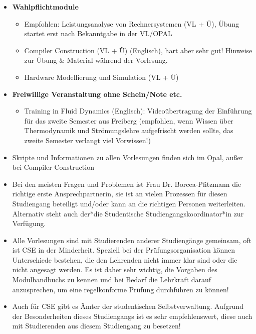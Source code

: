 \documentclass[a4paper,12pt]{report}
\begin{document}
\begin{itemize}
    \item \textbf{Wahlpflichtmodule}
    \begin{itemize}
        \item Empfohlen: Leistungsanalyse von Rechnersystemen (VL + Ü), Übung startet erst nach Bekanntgabe in der VL/OPAL
        \item Compiler Construction (VL + Ü) (Englisch), hart aber sehr gut! Hinweise zur Übung \& Material während der Vorlesung.
        \item Hardware Modellierung und Simulation (VL + Ü)
    \end{itemize}
    \item \textbf{Freiwillige Veranstaltung ohne Schein/Note etc.}
    \begin{itemize}
        \item Training in Fluid Dynamics (Englisch): Videoübertragung der Einführung für das zweite Semester aus Freiberg (empfohlen, wenn Wissen über Thermodynamik und Strömungslehre aufgefrischt werden sollte, das zweite Semester verlangt viel Vorwissen!)
    \end{itemize}
    \item Skripte und Informationen zu allen Vorlesungen finden sich im Opal, außer bei Compiler Construction
    \item Bei den meisten Fragen und Problemen ist Frau Dr. Borcea-Pfitzmann die richtige erste Ansprechpartnerin, sie ist an vielen Prozessen für diesen Studiengang beteiligt und/oder kann an die richtigen Personen weiterleiten. Alternativ steht auch der*die Studentische Studiengangskoordinator*in zur Verfügung.
    \item Alle Vorlesungen sind mit Studierenden anderer Studiengänge gemeinsam, oft ist CSE in der Minderheit. Speziell bei der Prüfungsorganisation können Unterschiede bestehen, die den Lehrenden nicht immer klar sind oder die nicht angesagt werden. Es ist daher sehr wichtig, die Vorgaben des Modulhandbuchs zu kennen und bei Bedarf die Lehrkraft darauf anzusprechen, um eine regelkonforme Prüfung durchführen zu können!
    \item Auch für CSE gibt es Ämter der studentischen Selbstverwaltung. Aufgrund der Besonderheiten dieses Studiengangs ist es sehr empfehlenswert, diese auch mit Studierenden aus diesem Studiengang zu besetzen!
\end{itemize}
\end{document}
